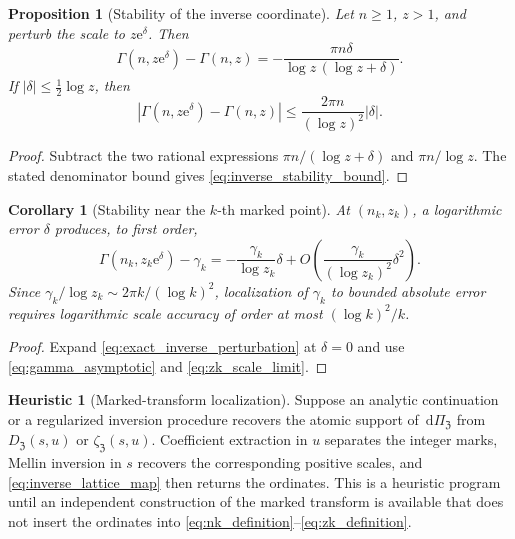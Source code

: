 \documentclass[11pt]{amsart}
\numberwithin{equation}{section}
\theoremstyle{plain}
\newtheorem{proposition}[theorem]{Proposition}
\newtheorem{corollary}[theorem]{Corollary}
\theoremstyle{definition}
\newtheorem{heuristic}[theorem]{Heuristic}
\theoremstyle{remark}
\newcommand{\dd}{\,\mathrm d}
\newcommand{\e}{\mathrm e}
\newcommand{\ZP}{\mathfrak Z}
\begin{document}
\begin{proposition}[Stability of the inverse coordinate]
\label{prop:inverse_coordinate_stability}
Let $n\geq1$, $z>1$, and perturb the scale to $z\e^\delta$.  Then
\begin{equation}
 \Gamma(n,z\e^\delta)-\Gamma(n,z)
 =-\frac{\pi n\delta}{\log z\,(\log z+\delta)}.
 \label{eq:exact_inverse_perturbation}
\end{equation}
If $|\delta|\leq\tfrac12\log z$, then
\begin{equation}
 \left|\Gamma(n,z\e^\delta)-\Gamma(n,z)\right|
 \leq\frac{2\pi n}{(\log z)^2}|\delta|.
 \label{eq:inverse_stability_bound}
\end{equation}
\end{proposition}

\begin{proof}
Subtract the two rational expressions
$\pi n/(\log z+\delta)$ and $\pi n/\log z$.  The stated denominator bound
gives \eqref{eq:inverse_stability_bound}.
\end{proof}

\begin{corollary}[Stability near the $k$-th marked point]
\label{cor:stability_near_kth_point}
At $(n_k,z_k)$, a logarithmic error $\delta$ produces, to first order,
\begin{equation}
 \Gamma(n_k,z_k\e^\delta)-\gamma_k
 =-\frac{\gamma_k}{\log z_k}\delta+O\left(
 \frac{\gamma_k}{(\log z_k)^2}\delta^2\right).
 \label{eq:local_inverse_linearization}
\end{equation}
Since $\gamma_k/\log z_k\sim2\pi k/(\log k)^2$, localization of
$\gamma_k$ to bounded absolute error requires logarithmic scale accuracy of
order at most $(\log k)^2/k$.
\end{corollary}

\begin{proof}
Expand \eqref{eq:exact_inverse_perturbation} at $\delta=0$ and use
\eqref{eq:gamma_asymptotic} and \eqref{eq:zk_scale_limit}.
\end{proof}

\begin{heuristic}[Marked-transform localization]
\label{heur:marked_transform_localization}
Suppose an analytic continuation or a regularized inversion procedure recovers
the atomic support of $\dd\Pi_{\ZP}$ from $D_{\ZP}(s,u)$ or
$\zeta_{\ZP}(s,u)$.  Coefficient extraction in $u$ separates the integer
marks, Mellin inversion in $s$ recovers the corresponding positive scales,
and \eqref{eq:inverse_lattice_map} then returns the ordinates.  This is a
heuristic program until an independent construction of the marked transform
is available that does not insert the ordinates into
\eqref{eq:nk_definition}--\eqref{eq:zk_definition}.
\end{heuristic}
\end{document}
